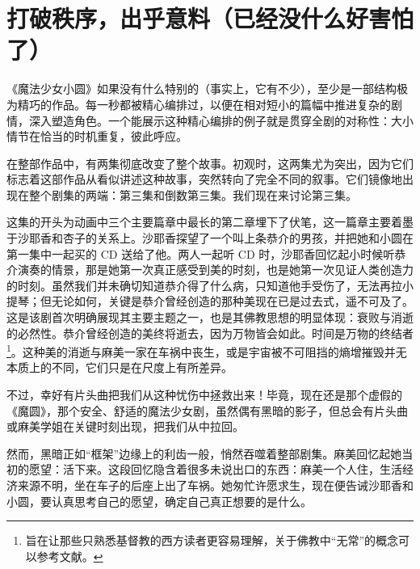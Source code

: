 \chapter[打破秩序，出乎意料（已经没什么好害怕了）]{打破秩序，出乎意料\protect\footnotemark（已经没什么好害怕了）}


《魔法少女小圆》如果没有什么特别的（事实上，它有不少），至少是一部结构极为精巧的作品。每一秒都被精心编排过，以便在相对短小的篇幅中推进复杂的剧情，深入塑造角色。一个能展示这种精心编排的例子就是贯穿全剧的对称性：大小情节在恰当的时机重复，彼此呼应。

在整部作品中，有两集彻底改变了整个故事。初观时，这两集尤为突出，因为它们标志着这部作品从看似讲述这种故事，突然转向了完全不同的叙事。它们镜像地出现在整个剧集的两端：第三集和倒数第三集。我们现在来讨论第三集。

这集的开头为动画中三个主要篇章中最长的第二章埋下了伏笔，这一篇章主要着墨于沙耶香和杏子的关系上。沙耶香探望了一个叫上条恭介的男孩，并把她和小圆在第一集中一起买的 CD 送给了他。两人一起听 CD 时，沙耶香回忆起小时候听恭介演奏的情景，那是她第一次真正感受到美的时刻，也是她第一次见证人类创造力的时刻。虽然我们并未确切知道恭介得了什么病，只知道他手受伤了，无法再拉小提琴；但无论如何，关键是恭介曾经创造的那种美现在已是过去式，遥不可及了。这是该剧首次明确展现其主要主题之一，也是其佛教思想的明显体现：衰败与消逝的必然性。恭介曾经创造的美终将逝去，因为万物皆会如此。时间是万物的终结者\footnote{旨在让那些只熟悉基督教的西方读者更容易理解，关于佛教中“无常”的概念可以参考文献\cite{ref25}。}。这种美的消逝与麻美一家在车祸中丧生，或是宇宙被不可阻挡的熵增摧毁并无本质上的不同，它们只是在尺度上有所差异。

不过，幸好有片头曲把我们从这种忧伤中拯救出来！毕竟，现在还是那个虚假的《魔圆》，那个安全、舒适的魔法少女剧，虽然偶有黑暗的影子，但总会有片头曲或麻美学姐在关键时刻出现，把我们从中拉回。

然而，黑暗正如“框架”边缘上的利齿一般，悄然吞噬着整部剧集。麻美回忆起她当初的愿望：活下来。这段回忆隐含着很多未说出口的东西：麻美一个人住，生活经济来源不明，坐在车子的后座上出了车祸。她匆忙许愿求生，现在便告诫沙耶香和小圆，要认真思考自己的愿望，确定自己真正想要的是什么。

